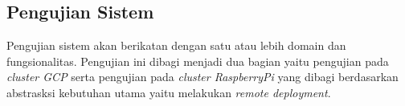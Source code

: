 \subsection{Pengujian Sistem}
Pengujian sistem akan berikatan dengan satu atau lebih domain dan fungsionalitas. Pengujian ini dibagi menjadi dua bagian yaitu pengujian pada \textit{cluster GCP} serta pengujian pada \textit{cluster RaspberryPi} yang dibagi berdasarkan abstrasksi kebutuhan utama yaitu melakukan \textit{remote deployment}.



